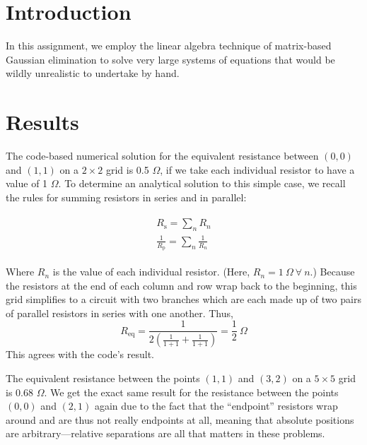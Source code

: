 \documentclass{article}
\author{\hwauthor}
\title{\hwtitle}
\date{\hwdate}
\begin{document}
\maketitle
\thispagestyle{fancy}

\section{Introduction}

In this assignment, we employ the linear algebra technique of matrix-based Gaussian elimination to solve very large systems of equations that would be wildly unrealistic to undertake by hand.

\section{Results}

\bigskip
{}
\medskip

The code-based numerical solution for the equivalent resistance between $(0,0)$ and $(1,1)$ on a $2\times2$ grid is 0.5 $\Omega$, if we take each individual resistor to have a value of 1 $\Omega$. To determine an analytical solution to this simple case, we recall the rules for summing resistors in series and in parallel:

\begin{gather*}
              \begin{aligned}
               R_{\text{s}} = \sum_{n} {R_n} \\ 
               \frac{1}{R_{\text{p}}} = \sum_{n} {\frac{1}{R_n}}
             \end{aligned}
\end{gather*}

Where $R_n$ is the value of each individual resistor. (Here, $R_n = 1\ \Omega\ \forall\ n$.) Because the resistors at the end of each column and row wrap back to the beginning, this grid simplifies to a circuit with two branches which are each made up of two pairs of parallel resistors in series with one another. Thus,
\begin{equation*}
    R_\text{eq} = \frac{1}{2\left(\frac{1}{1+1}+\frac{1}{1+1}\right)} = \frac{1}{2}\ \Omega
\end{equation*}
This agrees with the code's result.

\bigskip
{}
\medskip

The equivalent resistance between the points $(1,1)$ and $(3,2)$ on a $5\times5$ grid is 0.68 $\Omega$. We get the exact same result for the resistance between the points $(0,0)$ and $(2,1)$ again due to the fact that the ``endpoint'' resistors wrap around and are thus not really endpoints at all, meaning that absolute positions are arbitrary---relative separations are all that matters in these problems.
\end{document}
